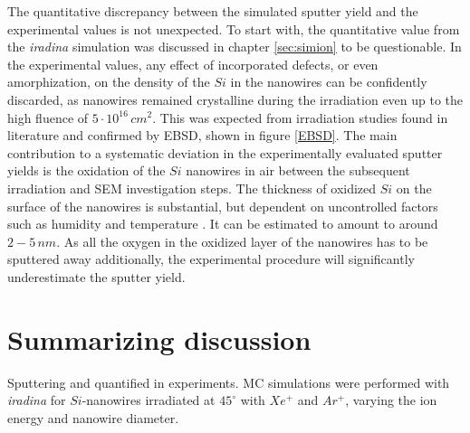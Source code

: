 The quantitative discrepancy between the simulated sputter yield and the experimental values is not unexpected. To start with, the quantitative value from the \emph{iradina} simulation was discussed in chapter \ref{sec:simion} to be questionable. In the experimental values, any effect of incorporated defects, or even amorphization, on the density of the $Si$ in the nanowires can be confidently discarded, as nanowires remained crystalline during the irradiation even up to the high fluence of $5\cdot 10^{16}\,cm^2$. This was expected from irradiation studies found in literature \cite{pelaz_ion-beam-induced_2004} and confirmed by EBSD, shown in figure \ref{EBSD}. The main contribution to a systematic deviation in the experimentally evaluated sputter yields is the oxidation of the $Si$ nanowires in air between the subsequent irradiation and SEM investigation steps. The thickness of oxidized $Si$ on the surface of the nanowires is substantial, but dependent on uncontrolled factors such as humidity and temperature \cite{lukes_oxidation_1972,al-bayati_composition_1991}. It can be estimated to amount to around $2-5\,nm$. As all the oxygen in the oxidized layer of the nanowires has to be sputtered away additionally, the experimental procedure will significantly underestimate the sputter yield.


\section{Summarizing discussion}



Sputtering  and quantified in experiments. MC simulations were performed with \emph{iradina} for $Si$-nanowires irradiated at $45^\circ$ with $Xe^+$ and $Ar^+$, varying the ion energy and nanowire diameter. 

